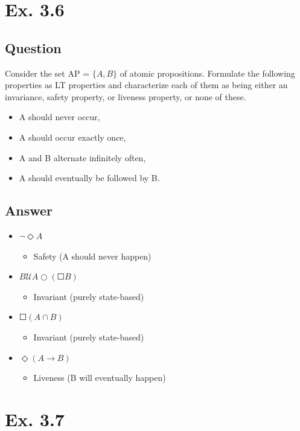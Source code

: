 \documentclass[12pt]{article}
\begin{document}
\newpage
\section*{Ex. 3.6}
\subsection*{Question}
Consider the set AP = $\{A,B\}$ of atomic propositions. Formulate the following
properties as LT properties and characterize each of them as being either an invariance, safety
property, or liveness property, or none of these.
\begin{itemize}
	\item A should never occur,
	\item A should occur exactly once,
	\item A and B alternate infinitely often,
	\item A should eventually be followed by B.
\end{itemize}

\subsection*{Answer}
\begin{itemize}
	\item $\neg \Diamond A$
	\begin{itemize}
		\item Safety (A should never happen)
	\end{itemize}
	\item $B \mathcal{U}A\bigcirc(\Square B)$
	\begin{itemize}
		\item Invariant (purely state-based)
	\end{itemize}
	\item $\Square (A\cap B)$
	\begin{itemize}
		\item Invariant (purely state-based)
	\end{itemize}
	\item $\Diamond (A \rightarrow B)$
	\begin{itemize}
		\item Liveness (B will eventually happen)
	\end{itemize}
\end{itemize}

\newpage
\section*{Ex. 3.7}
\end{document}
